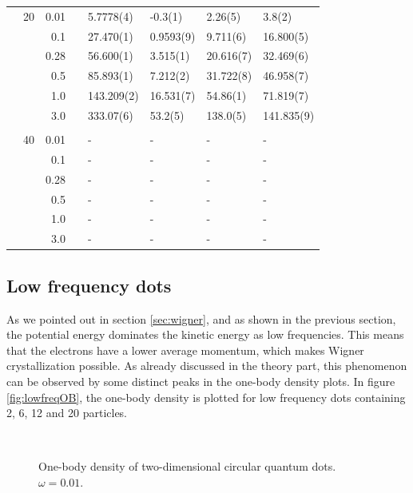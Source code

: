 \begin{table}
\begin{tabularx}{\textwidth}{R{1.5cm}rrcR{2.3cm}R{2.3cm}R{2.3cm}R{2.3cm}}
		&20 & 0.01 && 5.7778(4) & -0.3(1) & 2.26(5) & 3.8(2) \\
		&& 0.1 && 27.470(1) & 0.9593(9) & 9.711(6) & 16.800(5) \\
		&& 0.28 && 56.600(1) & 3.515(1) & 20.616(7) & 32.469(6) \\
		&& 0.5 && 85.893(1) & 7.212(2) & 31.722(8) & 46.958(7) \\
		&& 1.0 && 143.209(2) & 16.531(7) & 54.86(1) & 71.819(7) \\
		&& 3.0 && 333.07(6) & 53.2(5) & 138.0(5) & 141.835(9) \\ \hdashline \\
		
		&40 & 0.01 && - & - & - & - \\
		&& 0.1 && - & - & - & - \\
		&& 0.28 && - & - & - & - \\
		&& 0.5 && - & - & - & - \\
		&& 1.0 && - & - & - & - \\
		&& 3.0 && - & - & - & - \\ \hline \hline
	\end{tabularx}
\end{table}

\newpage
\subsection{Low frequency dots}
As we pointed out in section \ref{sec:wigner}, and as shown in the previous section, the potential energy dominates the kinetic energy as low frequencies. This means that the electrons have a lower average momentum, which makes Wigner crystallization possible. As already discussed in the theory part, this phenomenon can be observed by some distinct peaks in the one-body density plots. In figure \eqref{fig:lowfreqOB}, the one-body density is plotted for low frequency dots containing 2, 6, 12 and 20 particles. 

\begin{figure}[H]
	\centering
	\\
	\caption{One-body density of two-dimensional circular quantum dots. $\omega=0.01$.}
	\label{fig:lowfreqOB}
\end{figure}

